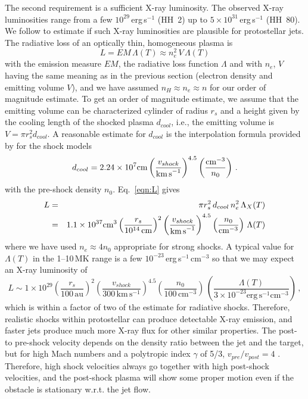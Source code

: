 The second requirement is a sufficient X-ray luminosity. The observed X-ray luminosities range from a few $10^{29}$\,erg\,s$^{-1}$ (HH~2) up to $5\times10^{31}$\,erg\,s$^{-1}$ (HH~80). We follow \citet{Raga_2002} to estimate if such X-ray luminosities are plausible for protostellar jets. The radiative loss of an optically thin, homogeneous plasma is 
\begin{equation}
L = EM\, \Lambda(T) \approx n_e^2\, V\,\Lambda(T)  \label{eqn:L}
\end{equation} 
with the emission measure $EM$, the radiative loss function $\Lambda$ and with $n_e$, $V$ having the same meaning as in the previous section (electron density and emitting volume $V$), and we have assumed $n_H\approx n_e \approx n$ for our order of magnitude estimate. To get an order of magnitude estimate, we assume that the emitting volume can be characterized cylinder of radius $r_s$ and a height given by the cooling length of the shocked plasma $d_{cool}$, i.e., the  emitting volume is $V = \pi r_s^2 d_{cool}$. 
A reasonable estimate for $d_{cool}$ is the interpolation formula provided by \citet{Heathcote_1998} for the \citet{Hartigan_1987} shock models
\begin{equation}
d_{cool} = 2.24\times10^7 \textrm{cm} \left(\frac{v_{shock} }{\textrm{km\,s}^{-1}} \right)^{4.5} \left(\frac{\textrm{cm}^{-3}}{n_0} \right)\,. \label{eq:dcool}
\end{equation}
with the pre-shock density $n_0$.  Eq.~\ref{eqn:L} gives
\begin{eqnarray}
L & = & \pi r_s^2  \, d_{cool} \, n_e^2\,\Lambda_X(T) \label{eq:L}\\
  & = &  1.1\times10^{37} \textrm{cm}^3 \left(\frac{r_s}{10^{14}\,\textrm{cm}}\right)^2 \left(\frac{v_{shock} }{\textrm{km\,s}^{-1}} \right)^{4.5} \left(\frac{n_0}{\textrm{cm}^{-3}} \right) \, \Lambda(T)
\end{eqnarray}
where we have used $n_e\approx4n_0$ appropriate for strong shocks. A typical value for $\Lambda(T)$ in the 1--10\,MK range is a few $10^{-23}$\,erg\,s$^{-1}\,$cm$^{-3}$ so that we may expect an X-ray luminosity of
\begin{equation}
L \sim 1\times10^{29} \left(\frac{r_s}{100\,\textrm{au}}\right)^2 \left(\frac{v_{shock}}{300\,\textrm{km}\,\textrm{s}^{-1}}\right)^{4.5} \left(\frac{n_0}{100\,\textrm{cm}^{-3}} \right) \, \left( \frac{\Lambda(T)}{3\times10^{-23} \textrm{erg}\, \textrm{s}^{-1} \textrm{cm}^{-3}} \right)\,,
\end{equation}
which is within a factor of two of the \citet{Raga_2002} estimate for radiative shocks. Therefore, realistic shocks within protostellar can produce detectable X-ray emission, and faster jets  produce much more X-ray flux for other similar properties. The post- to pre-shock velocity depends on the density ratio between the jet and the target, but 
for high Mach numbers and a  polytropic index $\gamma$ of 5/3, $v_{pre}/v_{post}=4$ \citep{Draine_1993}. Therefore, high shock velocities always go together with high post-shock velocities, and the post-shock plasma will show some proper motion even if the obstacle is stationary w.r.t. the jet flow.






